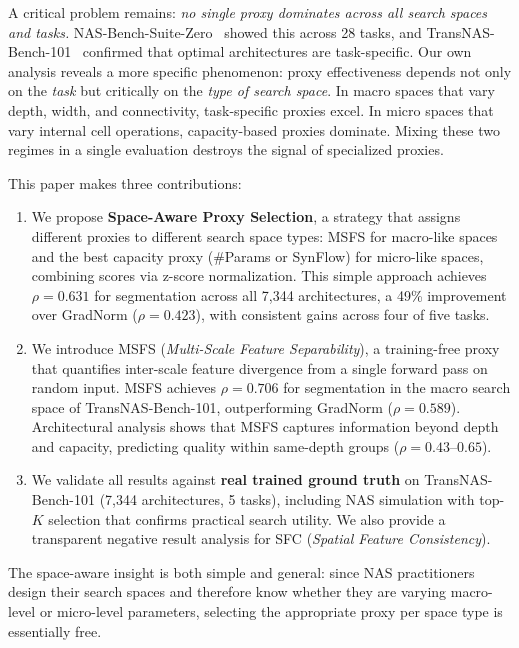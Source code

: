 \documentclass[10pt,twocolumn,letterpaper]{article}
\newcommand{\sfc}{\textsc{SFC}}
\newcommand{\msfs}{\textsc{MSFS}}
\begin{document}
A critical problem remains: \emph{no single proxy dominates across all search spaces and tasks.}
NAS-Bench-Suite-Zero~\cite{krishnakumar2022suitezero} showed this across 28 tasks, and TransNAS-Bench-101~\cite{duan2021transnasbench101} confirmed that optimal architectures are task-specific.
Our own analysis reveals a more specific phenomenon: proxy effectiveness depends not only on the \emph{task} but critically on the \emph{type of search space}.
In macro spaces that vary depth, width, and connectivity, task-specific proxies excel.
In micro spaces that vary internal cell operations, capacity-based proxies dominate.
Mixing these two regimes in a single evaluation destroys the signal of specialized proxies.

This paper makes three contributions:

\begin{enumerate}
    \item We propose \textbf{Space-Aware Proxy Selection}, a strategy that assigns different proxies to different search space types: \msfs{} for macro-like spaces and the best capacity proxy (\#Params or SynFlow) for micro-like spaces, combining scores via z-score normalization. This simple approach achieves $\rho{=}0.631$ for segmentation across all 7{,}344 architectures, a 49\% improvement over GradNorm ($\rho{=}0.423$), with consistent gains across four of five tasks.

    \item We introduce \msfs{} (\emph{Multi-Scale Feature Separability}), a training-free proxy that quantifies inter-scale feature divergence from a single forward pass on random input. \msfs{} achieves $\rho{=}0.706$ for segmentation in the macro search space of TransNAS-Bench-101, outperforming GradNorm ($\rho{=}0.589$). Architectural analysis shows that MSFS captures information beyond depth and capacity, predicting quality within same-depth groups ($\rho{=}0.43$--$0.65$).

    \item We validate all results against \textbf{real trained ground truth} on TransNAS-Bench-101 (7{,}344 architectures, 5 tasks), including NAS simulation with top-$K$ selection that confirms practical search utility. We also provide a transparent negative result analysis for \sfc{} (\emph{Spatial Feature Consistency}).
\end{enumerate}

The space-aware insight is both simple and general: since NAS practitioners design their search spaces and therefore know whether they are varying macro-level or micro-level parameters, selecting the appropriate proxy per space type is essentially free.
\end{document}
